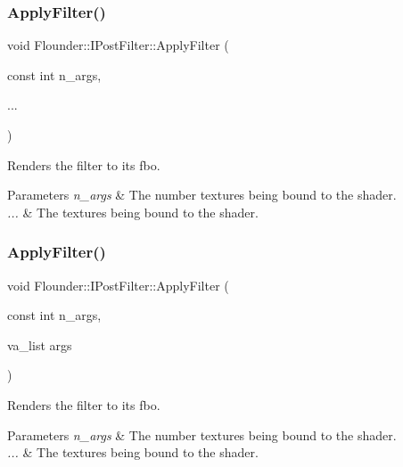 \subsubsection{\texorpdfstring{Apply\+Filter()}{ApplyFilter()}\hspace{0.1cm}{\footnotesize\ttfamily [1/2]}}
{\footnotesize\ttfamily void Flounder\+::\+I\+Post\+Filter\+::\+Apply\+Filter (\begin{DoxyParamCaption}\item[{const int}]{n\+\_\+args,  }\item[{}]{... }\end{DoxyParamCaption})}



Renders the filter to its fbo. 


\begin{DoxyParams}{Parameters}
{\em n\+\_\+args} & The number textures being bound to the shader. \\
\hline
{\em ...} & The textures being bound to the shader. \\
\hline
\end{DoxyParams}
\mbox{\label{class_flounder_1_1_i_post_filter_a634481cffc144c76c4e422c89c1f331a}} 
\subsubsection{\texorpdfstring{Apply\+Filter()}{ApplyFilter()}\hspace{0.1cm}{\footnotesize\ttfamily [2/2]}}
{\footnotesize\ttfamily void Flounder\+::\+I\+Post\+Filter\+::\+Apply\+Filter (\begin{DoxyParamCaption}\item[{const int}]{n\+\_\+args,  }\item[{va\+\_\+list}]{args }\end{DoxyParamCaption})}



Renders the filter to its fbo. 


\begin{DoxyParams}{Parameters}
{\em n\+\_\+args} & The number textures being bound to the shader. \\
\hline
{\em ...} & The textures being bound to the shader. \\
\hline
\end{DoxyParams}
\mbox{\label{class_flounder_1_1_i_post_filter_a9b48c22748de5b609615aa8f4a6ee8ab}} 
